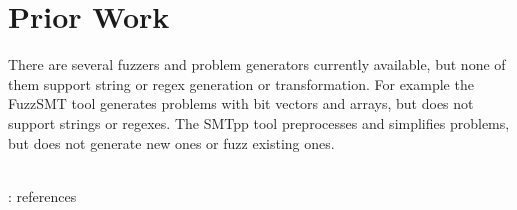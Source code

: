 \section{Prior Work}

    There are several fuzzers and problem generators currently available, but none of them support string or regex generation or transformation. For example the FuzzSMT\cite{fuzzsmt} tool generates \smt{} problems with bit vectors and arrays, but does not support strings or regexes. The SMTpp\cite{smtpp} tool preprocesses and simplifies problems, but does not generate new ones or fuzz existing ones.


    \hfill \\
    \todo{}: references
